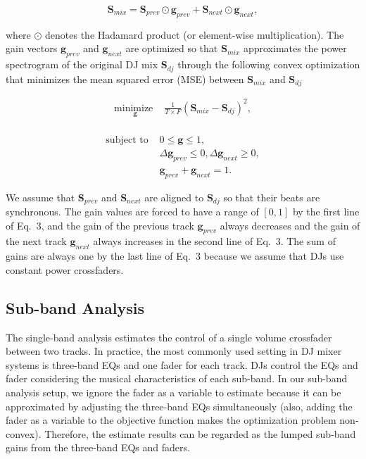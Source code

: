 \documentclass[sigconf]{nimeart}
\begin{document}
\begin{equation}\bm{S}_{mix} = \bm{S}_{prev} \odot \bm{g}_{prev} + \bm{S}_{next} \odot \bm{g}_{next},\end{equation}


where $\odot$ denotes the Hadamard product (or element-wise multiplication). The gain vectors $\bm{g}_{prev}$ and $\bm{g}_{next}$ are optimized so that $\bm{S}_{mix}$ approximates the power spectrogram of the original DJ mix $\bm{S}_{dj}$ through the following convex optimization that minimizes the mean squared error (MSE) between $\bm{S}_{mix}$ and $\bm{S}_{dj}$


\begin{equation}\begin{aligned}
\underset{\bm{g}}{\text{minimize }} &\frac{1}{T \times F}(\bm{S}_{mix} - \bm{S}_{dj})^2, \\[10px]
\end{aligned}\end{equation}

\begin{equation}\begin{aligned}
\text{subject to }
& 0 \leq \bm{g} \leq 1,\\
& \Delta \bm{g}_{prev} \leq 0, \Delta \bm{g}_{next} \geq 0,\\
& \bm{g}_{prev} + \bm{g}_{next} = 1. \end{aligned}\end{equation}


We assume that $\bm{S}_{prev}$ and $\bm{S}_{next}$ are aligned to $\bm{S}_{dj}$ so that their beats are synchronous. The gain values are forced to have a range of $[0, 1]$ by the first line of Eq.~3, and the gain of the previous track $\bm{g}_{prev}$ always decreases and the gain of the next track $\bm{g}_{next}$ always increases in the second line of Eq.~3. The sum of gains are always one by the last line of Eq.~3 because we assume that DJs use constant power crossfaders.

\subsection{Sub-band Analysis}\label{sub-band-analysis}

The single-band analysis estimates the control of a single volume crossfader between two tracks. In practice, the most commonly used setting in DJ mixer systems is three-band EQs and one fader for each track. DJs control the EQs and fader considering the musical characteristics of each sub-band. In our sub-band analysis setup, we ignore the fader as a variable to estimate because it can be approximated by adjusting the three-band EQs simultaneously (also, adding the fader as a variable to the objective function makes the optimization problem non-convex). Therefore, the estimate results can be regarded as the lumped sub-band gains from the three-band EQs and faders.
\end{document}
